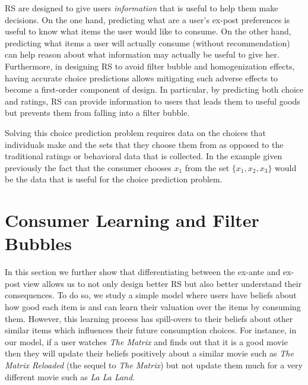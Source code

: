 \documentclass[sigconf]{acmart}
\begin{document}
\par
RS are designed to give users \textit{information} that is useful to help them make decisions. On the one hand, predicting what are a user's ex-post preferences is useful to know what items the user would like to consume. On the other hand, predicting what items a user will actually consume (without recommendation) can help reason about what information may actually be useful to give her. Furthermore, in designing RS to avoid filter bubble and homogenization effects, having accurate choice predictions allows mitigating such adverse effects to become a first-order component of design. In particular, by predicting both choice and ratings, RS can provide information to users that leads them to useful goods but prevents them from falling into a filter bubble. 
\par
Solving this choice prediction problem requires data on the choices that individuals make and the sets that they choose them from as opposed to the traditional ratings or behavioral data that is collected. In the example given previously the fact that the consumer chooses $x_1$ from the set $\{x_1, x_2, x_3 \}$ would be the data that is useful for the choice prediction problem.

\section{Consumer Learning and Filter Bubbles}\label{sec:consumer_learning}
In this section we further show that differentiating between the ex-ante and ex-post view allows us to not only design better RS but also better understand their consequences. To do so, we study a simple model where users have beliefs about how good each item is and can learn their valuation over the items by consuming them. However, this learning process has spill-overs to their beliefs about other similar items which influences their future consumption choices. For instance, in our model, if a user watches \textit{The Matrix} and finds out that it is a good movie then they will update their beliefs positively about a similar movie such as \textit{The Matrix Reloaded} (the sequel to \textit{The Matrix}) but not update them much for a very different movie such as \textit{La La Land}.
\end{document}
